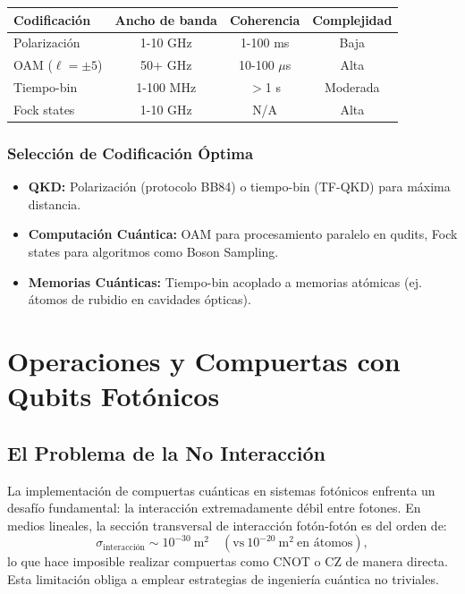 \documentclass{article}
\begin{document}
\begin{table}[h]
\centering
\small
\begin{tabular}{|l|c|c|c|}
\hline
\textbf{Codificación} & \textbf{Ancho de banda} & \textbf{Coherencia} & \textbf{Complejidad} \\
\hline
Polarización & 1-10 GHz & 1-100 ms & Baja \\
OAM ($\ell=\pm 5$) & 50+ GHz & 10-100 $\mu$s & Alta \\
Tiempo-bin & 1-100 MHz & $>$1 s & Moderada \\
Fock states & 1-10 GHz & N/A & Alta \\
\hline
\end{tabular}
\end{table}

\subsubsection*{Selección de Codificación Óptima}

\begin{itemize}
    \item \textbf{QKD:} Polarización (protocolo BB84) o tiempo-bin (TF-QKD) para máxima distancia.
    \item \textbf{Computación Cuántica:} OAM para procesamiento paralelo en qudits, Fock states para algoritmos como Boson Sampling.
    \item \textbf{Memorias Cuánticas:} Tiempo-bin acoplado a memorias atómicas (ej. átomos de rubidio en cavidades ópticas).
\end{itemize}

\section{Operaciones y Compuertas con Qubits Fotónicos}

\subsection*{El Problema de la No Interacción}

La implementación de compuertas cuánticas en sistemas fotónicos enfrenta un desafío fundamental: la interacción extremadamente débil entre fotones. En medios lineales, la sección transversal de interacción fotón-fotón es del orden de:
\[
\sigma_{\text{interacción}} \sim 10^{-30}\ \text{m}^2 \quad (\text{vs}\ 10^{-20}\ \text{m}^2\ \text{en átomos}),
\]
lo que hace imposible realizar compuertas como CNOT o CZ de manera directa. Esta limitación obliga a emplear estrategias de ingeniería cuántica no triviales.
\end{document}
